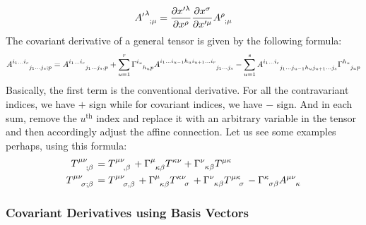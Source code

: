 $$\tensor{{A'}}{^\lambda _{;\mu}} =\pdv{x'^\lambda}{x^\rho} \pdv{x^\sigma}{x'^\mu}\tensor{A}{^\rho _; _\mu}$$
The covariant derivative of a general tensor is given by the following formula:
$$\tensor{A}{^{i_1\ldots i_r} _{j_1\ldots j_s;p}} = \tensor{A}{^{i_1\ldots i_r} _{j_1\ldots j_s,p}} + 
\sum\limits_{u=1}^r \tensor{\Gamma}{^{i_u} _{h_u p}}\tensor{A}{^{i_1\ldots i_{u-1}h_u i_{u+1}\ldots i_r} _{j_1\ldots j_s}} - \sum\limits_{u=1}^s \tensor{A}{^{i_1\ldots i_r} _{j_1 \ldots j_{u-1}h_u j_{u+1}\ldots j_s}}\tensor{\Gamma}{^{h_u} _{j_u p}}$$
Basically, the first term is the conventional derivative. For all the contravariant indices, we have $+$ sign while for covariant indices, we have $-$ sign. And in each sum, remove the $u^{\text{th}}$ index and replace it with an arbitrary variable in the tensor and then accordingly adjust the affine connection. Let us see some examples perhaps, using this formula:
\begin{align*}
    \tensor{T}{^\mu ^\nu _{;\beta}} &= \tensor{T}{^\mu ^\nu _{,\beta}} + \tensor{\Gamma}{^\mu _\kappa _\beta}\tensor{T}{^\kappa ^\nu} + \tensor{\Gamma}{^\nu _\kappa _\beta}\tensor{T}{^\mu ^\kappa}\\
\tensor{T}{^\mu ^\nu _{\sigma;\beta}} &= \tensor{T}{^\mu ^\nu _{\sigma,\beta}} + \tensor{\Gamma}{^\mu _\kappa _\beta}\tensor{T}{^\kappa ^\nu _\sigma} + \tensor{\Gamma}{^\nu _\kappa _\beta}\tensor{T}{^\mu ^\kappa _\sigma} - \tensor{\Gamma}{^\kappa _{\sigma \beta}}\tensor{A}{^{\mu \nu} _\kappa}
\end{align*}
\subsubsection{Covariant Derivatives using Basis Vectors}

